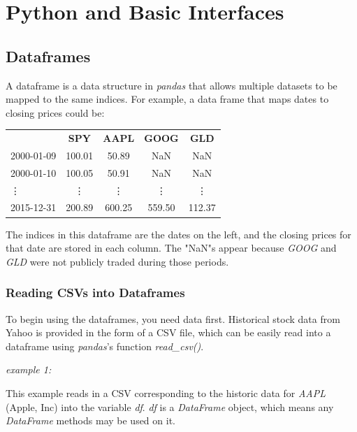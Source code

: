 \chapter{Python and Basic Interfaces}
\section{Dataframes}
\noindent A dataframe is a data structure in \textit{pandas} that allows multiple datasets to be mapped to the same indices. For example, a data frame that maps dates to closing prices could be:

\begin{center}
    \begin{tabular}{lcccc}
         & \textbf{SPY} & \textbf{AAPL} & \textbf{GOOG} & \textbf{GLD}\\
        2000-01-09 & 100.01 & 50.89 & NaN & NaN\\
        2000-01-10 & 100.05 & 50.91 & NaN & NaN\\
        \vdots & \vdots & \vdots & \vdots & \vdots \\
        2015-12-31 & 200.89 & 600.25 & 559.50 & 112.37
    \end{tabular}
\end{center}

\noindent The indices in this dataframe are the dates on the left, and the closing prices for that date are stored in each column. The "NaN"s appear because \textit{GOOG} and \textit{GLD} were not publicly traded during those periods. 

\subsection{Reading CSVs into Dataframes}
\noindent To begin using the dataframes, you need data first. Historical stock data from Yahoo is provided in the form of a CSV file, which can be easily read into a dataframe using \textit{pandas}'s function \textit{read\_csv()}.\\

\noindent\begin{minipage}{\linewidth}
\noindent\textit{example 1:}

\end{minipage}

\noindent This example reads in a CSV corresponding to the historic data for \textit{AAPL} (Apple, Inc) into the variable \textit{df}. \textit{df} is a \textit{DataFrame} object, which means any \textit{DataFrame} methods may be used on it.\\


